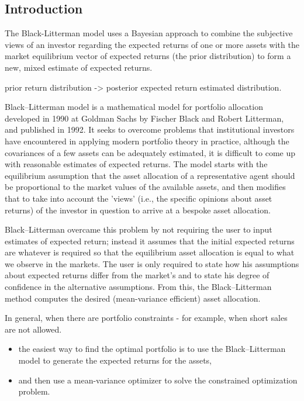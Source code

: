 \documentclass[presentation]{beamer}
\begin{document}
\subsection{Introduction}
\label{sec:orgheadline23}
The Black-Litterman model uses a \alert{Bayesian} approach to combine the subjective views of an investor regarding the expected returns of one or more assets with the market equilibrium vector of expected returns (the prior distribution) to form a new, mixed estimate of expected returns.

prior return distribution -> posterior expected return estimated distribution.

Black–Litterman model is a mathematical model for portfolio allocation developed in 1990 at Goldman Sachs by Fischer Black and Robert Litterman, and published in 1992. It seeks to overcome problems that institutional investors have encountered in applying modern portfolio theory in practice, although the covariances of a few assets can be adequately estimated, \alert{it is difficult to come up with reasonable estimates of expected returns}. The model starts with the equilibrium assumption that the asset allocation of a representative agent should be proportional to the market values of the available assets, and then modifies that to take into account the 'views' (i.e., the specific opinions about asset returns) of the investor in question to arrive at a bespoke asset allocation.

Black–Litterman overcame this problem by not requiring the user to input estimates of expected return; instead it assumes that the initial expected returns are whatever is required so that the equilibrium asset allocation is equal to what we observe in the markets. \alert{The user is only required to state how his assumptions about expected returns differ from the market's and to state his degree of confidence in the alternative assumptions}. From this, the Black–Litterman method computes the desired (mean-variance efficient) asset allocation.

In general, when there are portfolio constraints - for example, when short sales are not allowed.
\begin{itemize}
\item the easiest way to find the optimal portfolio is to use the Black–Litterman model to generate the expected returns for the assets,
\item and then use a mean-variance optimizer to solve the constrained optimization problem.
\end{itemize}
\end{document}
